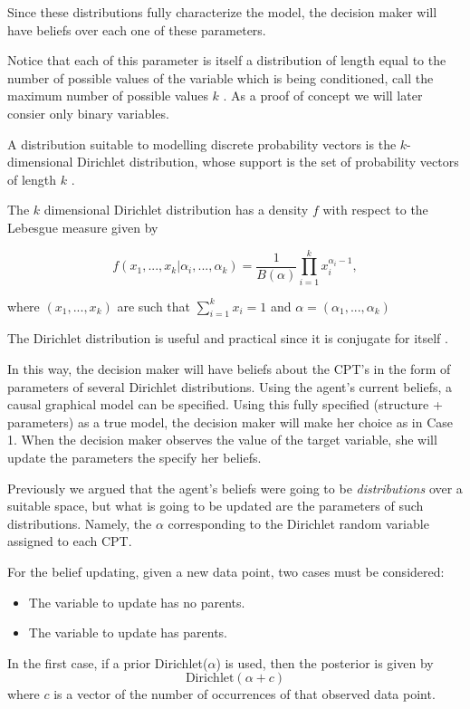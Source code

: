 \documentclass{article}
\begin{document}
Since these distributions fully characterize the model, the decision maker will have beliefs over each one of these parameters. 

Notice that each of this parameter is itself a distribution of length equal to the number of possible values of the variable which is being conditioned, call the maximum number of possible values $k$ . As a proof of concept we will later consier only binary variables.

A distribution suitable to modelling discrete probability vectors is the $k$-dimensional Dirichlet distribution, whose support is the set of probability vectors of length $k$ \cite{hjort2010bayesian}. 

The $k$ dimensional Dirichlet distribution has a density $f$ with respect to the Lebesgue measure given by

\[ f(x_1,...,x_k | \alpha_i,...,\alpha_k)=\frac{1}{B(\alpha)}  \prod_{i=1}^k x_i^{\alpha_i-1},\]

where $(x_1,...,x_k)$ are such that $\sum_{i=1}^k x_i =1$ and $\alpha=(\alpha_1,...,\alpha_k)$

The Dirichlet distribution is useful and practical since it is conjugate for itself \cite{bernardo2000bayesian}.

In this way, the decision maker will have beliefs about the CPT's in the form of parameters of several Dirichlet distributions. Using the agent's current beliefs, a causal graphical model can be specified. Using this fully specified (structure + parameters) as a true model, the decision maker will make her choice as in Case 1. When the decision maker observes the value of the target variable, she will update the parameters the specify her beliefs.

Previously we argued that the agent's beliefs were going to be \textit{distributions} over a suitable space, but what is going to be updated are the parameters of such distributions. Namely, the $\alpha$ corresponding to the Dirichlet random variable assigned to each CPT.

For the belief updating, given a new data point,  two cases must be considered:
\begin{itemize}
\item The variable to update has no parents.
\item The variable to update has parents.
\end{itemize}

In the first case, if a prior Dirichlet($\alpha$) is used, then the posterior is given by
\[ \textrm{Dirichlet}(\alpha + c) \]
where $c$ is a vector of the number of occurrences of that observed data point. 
\end{document}

